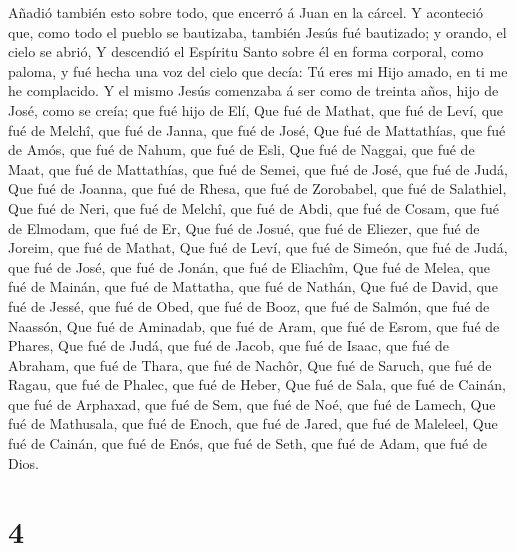  Añadió también esto sobre todo, que encerró á Juan en la
cárcel.  Y aconteció que, como todo el pueblo se bautizaba,
también Jesús fué bautizado; y orando, el cielo se abrió, 
Y descendió el Espíritu Santo sobre él en forma corporal, como paloma, y
fué hecha una voz del cielo que decía: Tú eres mi Hijo amado, en ti me
he complacido.  Y el mismo Jesús comenzaba á ser como de
treinta años, hijo de José, como se creía; que fué hijo de Elí,
 Que fué de Mathat, que fué de Leví, que fué de Melchî, que
fué de Janna, que fué de José,  Que fué de Mattathías, que
fué de Amós, que fué de Nahum, que fué de Esli,  Que fué de
Naggai, que fué de Maat, que fué de Mattathías, que fué de Semei, que
fué de José, que fué de Judá,  Que fué de Joanna, que fué
de Rhesa, que fué de Zorobabel, que fué de Salathiel,  Que
fué de Neri, que fué de Melchî, que fué de Abdi, que fué de Cosam, que
fué de Elmodam, que fué de Er,  Que fué de Josué, que fué
de Eliezer, que fué de Joreim, que fué de Mathat,  Que fué
de Leví, que fué de Simeón, que fué de Judá, que fué de José, que fué de
Jonán, que fué de Eliachîm,  Que fué de Melea, que fué de
Mainán, que fué de Mattatha, que fué de Nathán,  Que fué de
David, que fué de Jessé, que fué de Obed, que fué de Booz, que fué de
Salmón, que fué de Naassón,  Que fué de Aminadab, que fué
de Aram, que fué de Esrom, que fué de Phares,  Que fué de
Judá, que fué de Jacob, que fué de Isaac, que fué de Abraham, que fué de
Thara, que fué de Nachôr,  Que fué de Saruch, que fué de
Ragau, que fué de Phalec, que fué de Heber,  Que fué de
Sala, que fué de Cainán, que fué de Arphaxad, que fué de Sem, que fué de
Noé, que fué de Lamech,  Que fué de Mathusala, que fué de
Enoch, que fué de Jared, que fué de Maleleel,  Que fué de
Cainán, que fué de Enós, que fué de Seth, que fué de Adam, que fué de
Dios.

\hypertarget{section-3}{%
\section{4}\label{section-3}}

